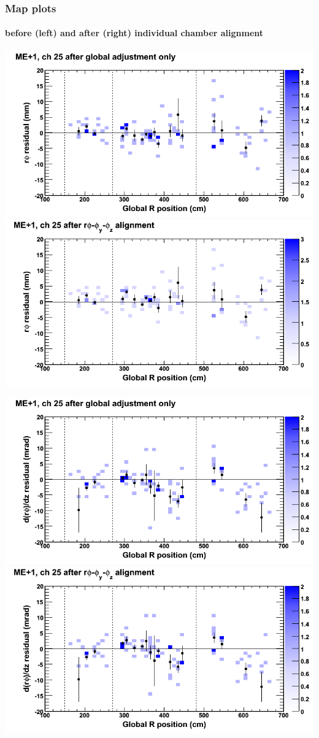 \documentclass[compress]{beamer}
\begin{document}
\begin{frame}
\frametitle{Map plots}
\framesubtitle{before (left) and after (right) individual chamber alignment}
\includegraphics[width=0.5\linewidth]{ringmapplots_3dof/before_CSCvsr_mep1ch25_x.png} \includegraphics[width=0.5\linewidth]{ringmapplots_3dof/after_CSCvsr_mep1ch25_x.png}

\includegraphics[width=0.5\linewidth]{ringmapplots_3dof/before_CSCvsr_mep1ch25_dxdz.png} \includegraphics[width=0.5\linewidth]{ringmapplots_3dof/after_CSCvsr_mep1ch25_dxdz.png}
\end{frame}
\end{document}

